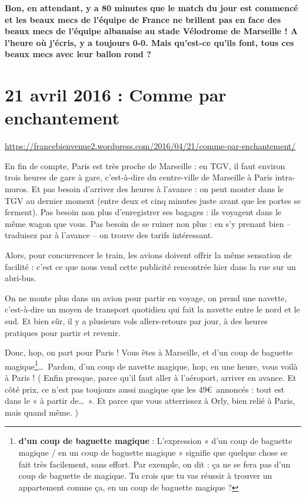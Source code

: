 \documentclass[11pt, french]{report}
\begin{document}
\textbf{Bon, en attendant, y a 80 minutes que le match du jour est commencé et les
  beaux mecs de l’équipe de France ne brillent pas en face des beaux mecs de l’équipe
  albanaise au stade Vélodrome de Marseille ! A l’heure où j’écris, y a toujours 0-0.
  Mais qu’est-ce qu’ils font, tous ces beaux mecs avec leur ballon rond ?}

\vfill

\chapter{21 avril 2016 : Comme par enchantement}

\url{https://francebienvenue2.wordpress.com/2016/04/21/comme-par-enchantement/}

\vfill

En fin de compte, Paris est très proche de Marseille : en TGV, il faut environ
trois heures de gare à gare, c'est-à-dire du centre-ville de Marseille à Paris
intra-muros. Et pas besoin d'arriver des heures à l'avance : on peut monter
dans le TGV au dernier moment (entre deux et cinq minutes juste avant que les
portes se ferment).  Pas besoin non plus d'enregistrer ses bagages : ils
voyagent dans le même wagon que vous. Pas besoin de se ruiner non plus : en
s'y prenant bien -- traduisez par à l'avance -- on trouve des tarifs
intéressant.

Alors, pour concurrencer le train, les avions doivent offrir la même sensation
de facilité : c’est ce que nous vend cette publicité rencontrée hier dans la
rue sur un abri-bus.

On ne monte plus dans un avion pour partir en voyage, on prend une navette,
c’est-à-dire un moyen de transport quotidien qui fait la navette entre le nord
et le sud. Et bien sûr, il y a plusieurs vols allers-retours par jour, à des
heures pratiques pour partir et revenir.

Donc, hop, on part pour Paris ! Vous êtes à Marseille, et d’un coup de baguette
magique\footnote{\textbf{d’un coup de baguette magique} : L’expression
  « d’un coup de baguette magique / en un coup de baguette magique » signifie
  que quelque chose se fait très facilement, sans effort.
  Par exemple, on dit : ça ne se fera pas d’un coup de baguette de magique.
  Tu crois que tu vas réussir à trouver un appartement comme ça, en un coup de
  baguette magique ? }\ldots\ Pardon, d’un coup de navette magique, hop, en
une heure, vous voilà à Paris ! ( Enfin presque, parce qu’il faut aller à
l’aéroport, arriver en avance. Et côté prix, ce n’est pas toujours aussi
magique que les 49\euro\ annoncés : tout est dans le « à partir de\ldots\ ». Et
parce que vous atterrissez à Orly, bien relié à Paris, mais quand même. )
\end{document}
